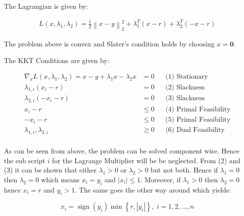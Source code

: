 \documentclass[]{article}
\DeclareMathOperator{\sign}{sign}
\newcommand{\MyParen}[1]{\left( #1 \right)}
\newcommand{\MyBrace}[1]{\left\lbrace #1 \right\rbrace}
\newcommand{\MyNormSqr}[2]{{\left\| #1 \right\|}_{#2}^{2}}
\newcommand{\MyNormTwoSqr}[1]{\MyNormSqr{#1}{2}}
\newcommand{\MyAbs}[1]{\left| #1 \right|}
\begin{document}
	The Lagrangian is given by:
	
	\begin{align*}
	L \MyParen{x, {\lambda}_{1}, {\lambda}_{2}} = \frac{1}{2} \MyNormTwoSqr{ x - y } + {\lambda}_{1}^{T} \MyParen{ x - r } + {\lambda}_{2}^{T} \MyParen{ -x - r }
	\end{align*}
	
	The problem above is convex and Slater's condition holds by choosing $ x = \boldsymbol{0} $.
	
	The KKT Conditions are given by:
	
	\begin{align*}
	{\nabla}_{x} L \MyParen{x, {\lambda}_{1}, {\lambda}_{2}} = x - y + {\lambda}_{1} x - {\lambda}_{2} x & = 0 && \text{(1) Stationary} \\
	{\lambda}_{1, i} \MyParen{ {x}_{i}  - r} 	& = 0 		&& \text{(2) Slackness} \\
	{\lambda}_{2, i} \MyParen{ -{x}_{i}  - r} 	& = 0 		&& \text{(3) Slackness} \\
	{x}_{i}  - r						& \leq 0 	&& \text{(4) Primal Feasibility} \\
	-{x}_{i}  - r						& \leq 0 	&& \text{(5) Primal Feasibility} \\
	{\lambda}_{1, i}, {\lambda}_{2, i} 							& \geq 0 	&& \text{(6) Dual Feasibility} \\
	\end{align*}
	
	As can be seen from above, the problem can be solved component wise. Hence the sub script $ i $ for the Lagrange Multiplier will be be neglected. From (2) and (3) it can be shown that either $ {\lambda}_{1} > 0 $ or $ {\lambda}_{2} > 0 $ but not both. Hence if $ {\lambda}_{1} = 0 $ then $ {\lambda}_{2} = 0 $ which means $ {x}_{i} = {y}_{i} $ and $ \MyAbs{ {x}_{i} } \leq 1 $.  Moreover, if $  {\lambda}_{1} > 0 $ then $ {\lambda}_{2} = 0 $ hence $ {x}_{i} = r $ and $ {y}_{i} > 1 $. The same goes the other way around which yields:
	
	$$ {x}_{i} = \sign \MyParen{ {y}_{i} } \min \MyBrace{ r, \MyAbs{ {y}_{i} } }, \; i = 1, 2, \ldots, n $$
	
\end{document}
